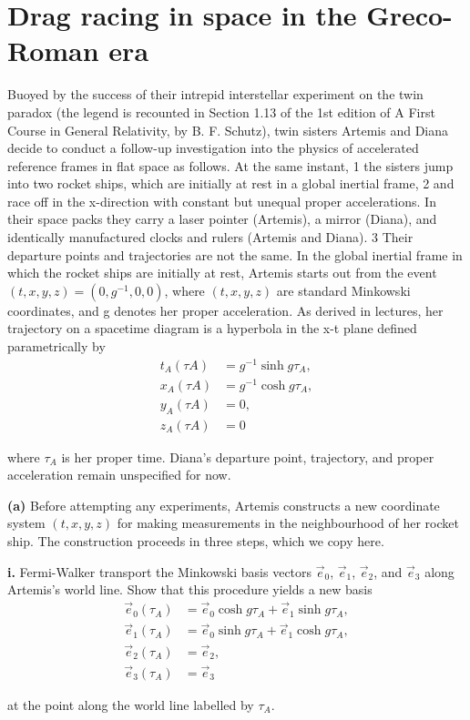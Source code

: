 \documentclass[a4paper]{article} %
\begin{document}
\section{Drag racing in space in the Greco-Roman era}
\begin{framed}
Buoyed by the success of their intrepid interstellar experiment on the twin paradox (the legend is recounted in Section 1.13 of the 1st edition of A First Course in General Relativity, by B. F. Schutz), twin sisters Artemis and Diana decide to conduct a follow-up investigation into the physics of accelerated reference frames in flat space as follows. At the same instant, 1 the sisters jump into two rocket ships, which are initially at rest in a global inertial frame, 2 and race off in the x-direction with constant but unequal proper accelerations. In their space packs they carry a laser pointer (Artemis), a mirror (Diana), and identically manufactured clocks and rulers (Artemis and Diana). 3 Their departure points and trajectories are not the same. In the global inertial frame in which the rocket ships are initially at rest, Artemis starts out from the event $(t, x, y, z) = (0, g^{-1}, 0, 0)$, where $(t, x, y, z)$ are standard Minkowski coordinates, and g denotes her proper acceleration. As derived in lectures, her trajectory on a spacetime diagram is a hyperbola in the x-t plane defined parametrically by
\begin{align}
t_A(\tau A) &= g^{-1} \sinh g\tau_A,\\
x_A(\tau A) &= g^{-1} \cosh g\tau_A,\\
y_A(\tau A) &= 0,\\
z_A(\tau A) &= 0
\end{align}

where $\tau_A$ is her proper time. Diana’s departure point, trajectory, and proper acceleration remain unspecified for now.
\end{framed}

\begin{framed}
\textbf{(a)}
Before attempting any experiments, Artemis constructs a new coordinate system $(t, x, y, z)$ for making measurements in the neighbourhood of her rocket ship. The construction proceeds in three steps, which we copy here. 
\end{framed}

\begin{framed}
\textbf{i.} 
Fermi-Walker transport the Minkowski basis vectors $\vec{e}_0$, $\vec{e}_1$, $\vec{e}_2$, and $\vec{e}_3$ along Artemis’s world line. Show that this procedure yields a new basis
\begin{align}
\vec{e}_0(\tau_A) &= \vec{e}_0 \cosh g\tau_A +\vec{e}_1 \sinh g\tau_A,\label{ai. eq1}\\
\vec{e}_1(\tau_A) &= \vec{e}_0 \sinh g\tau_A +\vec{e}_1 \cosh g\tau_A,\\
\vec{e}_2(\tau_A) &= \vec{e}_2,\\
\vec{e}_3(\tau_A) &= \vec{e}_3\label{ai. eq4}
\end{align}

at the point along the world line labelled by $\tau_A$.
\end{framed}
\end{document}
